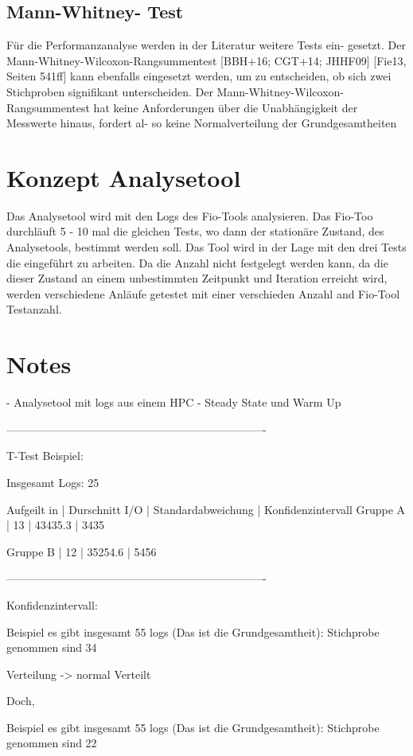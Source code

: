 \subsection{Mann-Whitney-
Test}
Für die Performanzanalyse werden in der Literatur weitere Tests ein-
gesetzt. Der Mann-Whitney-Wilcoxon-Rangsummentest [BBH+16; CGT+14; JHHF09]
[Fie13, Seiten 541ff] kann ebenfalls eingesetzt werden, um zu entscheiden, ob sich zwei
Stichproben signifikant unterscheiden. Der Mann-Whitney-Wilcoxon-Rangsummentest
hat keine Anforderungen über die Unabhängigkeit der Messwerte hinaus, fordert al-
so keine Normalverteilung der Grundgesamtheiten

\section{Konzept Analysetool}
Das Analysetool wird mit den Logs des Fio-Tools analysieren.
Das Fio-Too durchläuft 5 - 10 mal die gleichen Tests, wo dann der stationäre Zustand, des Analysetools,
bestimmt werden soll. Das Tool wird in der Lage mit den drei Tests die eingeführt zu arbeiten.
Da die Anzahl nicht festgelegt werden kann, da die dieser Zustand an einem unbestimmten Zeitpunkt und Iteration erreicht wird,
werden verschiedene Anläufe getestet mit einer verschieden Anzahl and Fio-Tool Testanzahl.

\section{Notes}

- Analysetool mit logs aus einem HPC
- Steady State und Warm Up

----------------------------------------------------------------------

T-Test Beispiel:

Insgesamt Logs: 25

Aufgeilt in 	| Durschnitt I/O | Standardabweichung | Konfidenzintervall
Gruppe A | 13	| 43435.3	 | 3435

Gruppe B | 12	| 35254.6	 | 5456	

----------------------------------------------------------------------

Konfidenzintervall:

Beispiel es gibt insgesamt 55 logs (Das ist die Grundgesamtheit):
Stichprobe genommen sind 34

Verteilung -> normal Verteilt

Doch,

Beispiel es gibt insgesamt 55 logs (Das ist die Grundgesamtheit):
Stichprobe genommen sind 22

